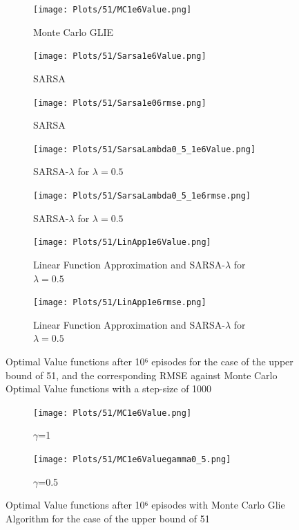 \documentclass[12pt,a4paper]{article}
\begin{document}
\begin{figure}
	\begin{subfigure}{.4\textwidth}
		\centering
		\label{E21_MC_V}
		\centering
		\texttt{[image: Plots/51/MC1e6Value.png]}
		\caption{Monte Carlo GLIE}
	\end{subfigure}%
	
	\begin{subfigure}{.4\textwidth}
		\centering
		\texttt{[image: Plots/51/Sarsa1e6Value.png]}
		\caption{\label{E21_S_V} SARSA}
	\end{subfigure}%
	\begin{subfigure}{.4\textwidth}
		\centering
		\texttt{[image: Plots/51/Sarsa1e06rmse.png]}
		\caption{\label{E21_S_V} SARSA}
	\end{subfigure}%
	
	
	\begin{subfigure}{.4\textwidth}
		\centering
		\texttt{[image: Plots/51/SarsaLambda0\_5\_1e6Value.png]}
		\caption{\label{E21_SL_V} SARSA-$\lambda$ for $\lambda=0.5$}
	\end{subfigure}%
	\begin{subfigure}{.4\textwidth}
		\centering
		\texttt{[image: Plots/51/SarsaLambda0\_5\_1e6rmse.png]}
		\caption{\label{E21_S_V} SARSA-$\lambda$ for $\lambda=0.5$}
	\end{subfigure}%
	
	
	\begin{subfigure}{.4\textwidth}
		\centering
		\texttt{[image: Plots/51/LinApp1e6Value.png]}
		\caption{\label{E21_SL_LA_V} Linear Function Approximation and SARSA-$\lambda$ for $\lambda=0.5$}
	\end{subfigure}%
	\begin{subfigure}{.4\textwidth}
		\centering
		\texttt{[image: Plots/51/LinApp1e6rmse.png]}
		\caption{\label{E21_S_V} Linear Function Approximation and SARSA-$\lambda$ for $\lambda=0.5$}
	\end{subfigure}%
	
	\caption{Optimal Value functions after 10⁶ episodes for the case of the upper bound of 51, and the corresponding RMSE against Monte Carlo Optimal Value functions with a step-size of 1000}
	\label{fig:case51}
\end{figure}

\begin{figure}
	\begin{subfigure}{.4\textwidth}
		\centering
		\label{E21_MC_V}
		\centering
		\texttt{[image: Plots/51/MC1e6Value.png]}
		\caption{$\gamma$=1}
	\end{subfigure}%
	\begin{subfigure}{.4\textwidth}
		\centering
		\texttt{[image: Plots/51/MC1e6Valuegamma0\_5.png]}
		\caption{\label{E21_S_V} $\gamma$=0.5}
	\end{subfigure}%
	\caption{Optimal Value functions after 10⁶ episodes with Monte Carlo Glie Algorithm for the case of the upper bound of 51}
	\label{fig:51_comp_gamma}
\end{figure}
\end{document}
